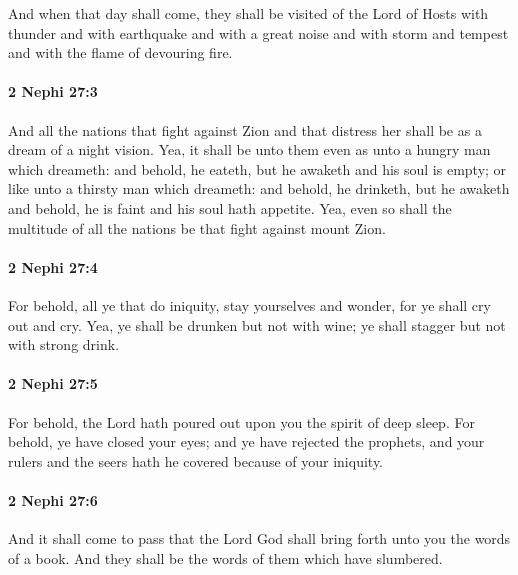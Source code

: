 			And when that day shall come,
			they shall be visited of the Lord of Hosts
			with thunder and with earthquake and with a great noise
			and with storm and tempest and with the flame of devouring fire.

		\paragraph{2 Nephi 27:3} %
			\label{2NEPHI-27-3}

			And all the nations that fight against Zion and that distress her
			shall be as a dream of a night vision.
			Yea, it shall be unto them
			even as unto a hungry man which dreameth:
			and behold, he eateth,
			but he awaketh and his soul is empty;
			or like unto a thirsty man which dreameth:
			and behold, he drinketh,
			but he awaketh and behold, he is faint and his soul hath appetite.
			Yea, even so shall the multitude of all the nations be that fight against mount Zion.

		\paragraph{2 Nephi 27:4} %
			\label{2NEPHI-27-4}

			For behold, all ye that do iniquity, stay yourselves and wonder,
			for ye shall cry out and cry.
			Yea, ye shall be drunken but not with wine;
			ye shall stagger but not with strong drink.

		\paragraph{2 Nephi 27:5} %
			\label{2NEPHI-27-5}

			For behold, the Lord hath poured out upon you the spirit of deep sleep.
			For behold, ye have closed your eyes;
			and ye have rejected the prophets,
			and your rulers and the seers hath he covered because of your iniquity.

		\paragraph{2 Nephi 27:6} %
			\label{2NEPHI-27-6}

			And it shall come to pass that
			the Lord God shall bring forth unto you the words of a book.
			And they shall be the words of them which have slumbered.

